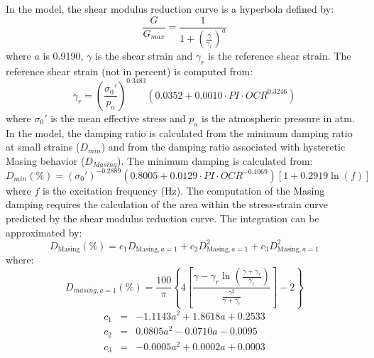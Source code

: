 \documentclass[12pt,oneside]{book}
\begin{document}
In the \citet{darendeli:01} model, the shear modulus reduction curve is a hyperbola defined by:
\begin{equation}
    \frac{G}{G_{max}} = \frac{1}{1 + \left( \frac{\gamma}{\gamma_r} \right)^{a}}
    \label{eq:shearmod}
\end{equation}
where $a$ is 0.9190, $\gamma$ is the shear strain and $\gamma_r$ is the reference shear strain.  The reference
shear strain (not in percent) is computed from:
\begin{equation}
    \gamma_r = \left(\frac{\sigma_0'}{p_a}\right)^{0.3483} \left( 0.0352 + 0.0010 \cdot PI \cdot OCR^{0.3246} \right)
\end{equation}
where $\sigma_0'$ is the mean effective stress and $p_a$ is the atmospheric pressure in atm. In the
model, the damping ratio is calculated from the minimum damping ratio at small strains ($D_{min}$)
and from the damping ratio associated with hysteretic Masing behavior ($D_{Masing}$).  The minimum
damping is calculated from:
\begin{equation}
    D_{min}(\%) = (\sigma_0')^{-0.2889} \left( 0.8005 + 0.0129 \cdot PI \cdot OCR ^{-0.1069} \right) \left[
    1 + 0.2919 \ln\left( f \right) \right]
    \label{eq:dmin}
\end{equation}
where $f$ is the excitation frequency (Hz). The computation of the Masing damping requires the
calculation of the area within the stress-strain curve predicted by the shear modulus reduction
curve.  The integration can be approximated by:
\begin{equation}
    D_\text{Masing}(\%) = c_1 D_{\text{Masing},a=1} + c_2 D_{\text{Masing},a=1}^2 + c_3
    D_{\text{Masing},a=1}^2
    \label{eq:dmasing}
\end{equation}
where:
\begin{equation}
    D_{masing,a=1}(\%) = \frac{100}{\pi} \left\{ 4 \left[ \frac{\gamma - \gamma_r\ln\left( \frac{\gamma +
    \gamma_r}{\gamma_r} \right)}{\frac{\gamma^2}{\gamma+\gamma_r}} \right] - 2 \right\} %
\end{equation}
\begin{equation}
    \begin{array}{rcl}
        c_1 & = & -1.1143 a^2 + 1.8618 a + 0.2533 \\
        c_2 & = & 0.0805 a^2 - 0.0710 a - 0.0095 \\
        c_3 & = & -0.0005 a^2 + 0.0002 a + 0.0003 \\
    \end{array}
\end{equation}
\end{document}

